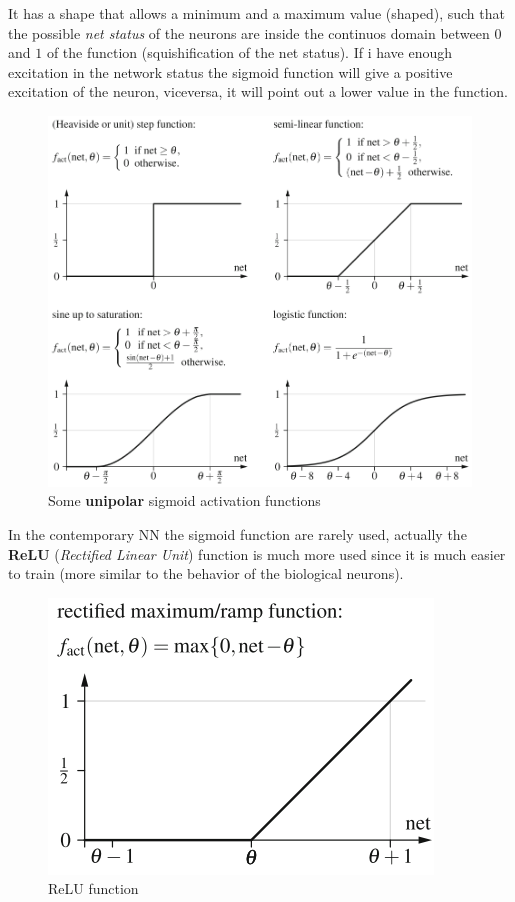 \documentclass{article}
\begin{document}
It has a shape that allows a minimum and a maximum value (shaped), such that the possible \textit{net status}
of the neurons are inside the continuos domain between $0$ and $1$ of the function (squishification of the net status).
If i have enough excitation in the network status the sigmoid function will give a positive excitation of the neuron,
viceversa, it will point out a lower value in the function.
\begin{figure}[H]
    \includegraphics[scale=0.45]{images/sigmoid_functions.png}
    \centering
    \caption{Some \textbf{unipolar} sigmoid activation functions}
\end{figure}
In the contemporary NN the sigmoid function are rarely used, actually the \textbf{ReLU} (\textit{Rectified Linear Unit})
function is much more used since it is much easier to train (more similar to the behavior of the biological neurons).
\begin{figure}[H]
    \centering
    \includegraphics[scale=0.5]{images/relu.png}
    \caption{ReLU function}
\end{figure}
\end{document}
